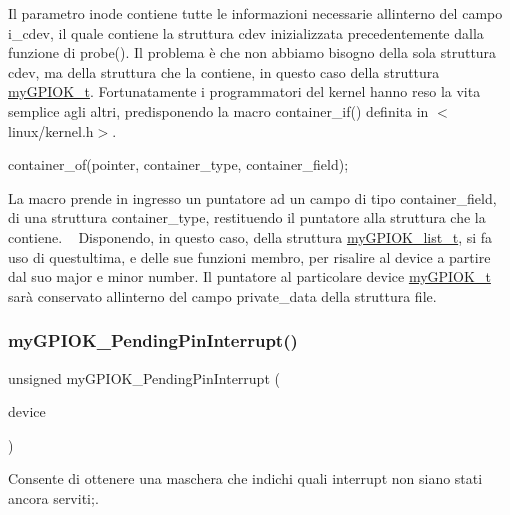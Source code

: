 Il parametro inode contiene tutte le informazioni necessarie all\textquotesingle{}interno del campo i\+\_\+cdev, il quale contiene la struttura cdev inizializzata precedentemente dalla funzione di probe(). Il problema è che non abbiamo bisogno della sola struttura cdev, ma della struttura che la contiene, in questo caso della struttura \hyperlink{structmy_g_p_i_o_k__t}{my\+G\+P\+I\+O\+K\+\_\+t}. Fortunatamente i programmatori del kernel hanno reso la vita semplice agli altri, predisponendo la macro container\+\_\+if() definita in $<$linux/kernel.\+h$>$. 
\begin{DoxyCode}
container\_of(pointer, container\_type, container\_field);
\end{DoxyCode}
 La macro prende in ingresso un puntatore ad un campo di tipo container\+\_\+field, di una struttura container\+\_\+type, restituendo il puntatore alla struttura che la contiene. ~\newline
 Disponendo, in questo caso, della struttura \hyperlink{structmy_g_p_i_o_k__list__t}{my\+G\+P\+I\+O\+K\+\_\+list\+\_\+t}, si fa uso di quest\textquotesingle{}ultima, e delle sue funzioni membro, per risalire al device a partire dal suo major e minor number. Il puntatore al particolare device \hyperlink{structmy_g_p_i_o_k__t}{my\+G\+P\+I\+O\+K\+\_\+t} sarà conservato all\textquotesingle{}interno del campo private\+\_\+data della struttura file.\mbox{\label{group___linux-_driver_ga3c78c03314722cfa7f32503ede4c29c4}} 
\subsubsection{\texorpdfstring{my\+G\+P\+I\+O\+K\+\_\+\+Pending\+Pin\+Interrupt()}{myGPIOK\_PendingPinInterrupt()}}
{\footnotesize\ttfamily unsigned my\+G\+P\+I\+O\+K\+\_\+\+Pending\+Pin\+Interrupt (\begin{DoxyParamCaption}\item[{\hyperlink{structmy_g_p_i_o_k__t}{my\+G\+P\+I\+O\+K\+\_\+t} $\ast$}]{device }\end{DoxyParamCaption})}



Consente di ottenere una maschera che indichi quali interrupt non siano stati ancora serviti;. 


